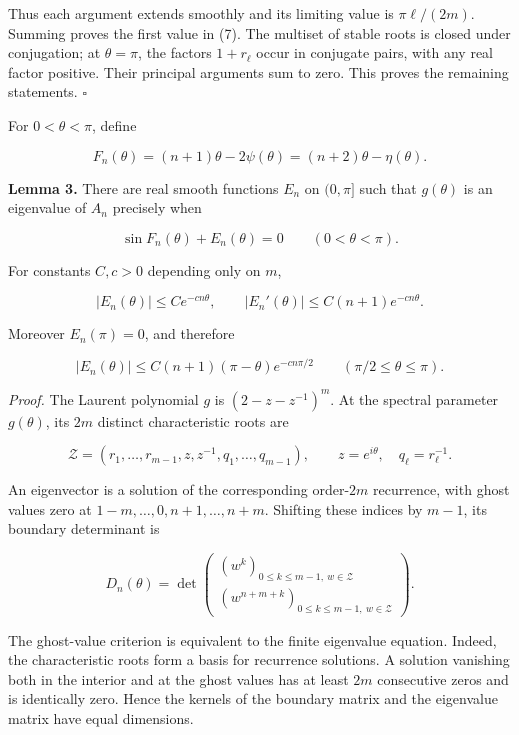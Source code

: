 \documentclass[10pt,a4paper]{article}
\begin{document}
Thus each argument extends smoothly and its limiting value is \(\pi\ell/(2m)\). Summing proves the first value in (7). The multiset of stable roots is closed under conjugation; at \(\theta=\pi\), the factors \(1+r_\ell\) occur in conjugate pairs, with any real factor positive. Their principal arguments sum to zero. This proves the remaining statements. \(\square\)

For \(0<\theta<\pi\), define

\nopagebreak[3]
\[
F_n(\theta)=(n+1)\theta-2\psi(\theta)=(n+2)\theta-\eta(\theta).
\tag{9}
\]

\textbf{Lemma 3.} There are real smooth functions \(E_n\) on \((0,\pi]\) such that \(g(\theta)\) is an eigenvalue of \(A_n\) precisely when

\nopagebreak[3]
\[
\sin F_n(\theta)+E_n(\theta)=0\qquad(0<\theta<\pi).
\tag{10}
\]

For constants \(C,c>0\) depending only on \(m\),

\nopagebreak[3]
\[
|E_n(\theta)|\le C e^{-cn\theta},\qquad
|E_n'(\theta)|\le C(n+1)e^{-cn\theta}.
\tag{11}
\]

Moreover \(E_n(\pi)=0\), and therefore

\nopagebreak[3]
\[
|E_n(\theta)|\le C(n+1)(\pi-\theta)e^{-cn\pi/2}
\qquad(\pi/2\le\theta\le\pi).
\tag{12}
\]

\emph{Proof.} The Laurent polynomial \(g\) is \((2-z-z^{-1})^m\). At the spectral parameter \(g(\theta)\), its \(2m\) distinct characteristic roots are

\nopagebreak[3]
\[
\mathcal Z=(r_1,\ldots,r_{m-1},z,z^{-1},q_1,\ldots,q_{m-1}),\qquad
z=e^{i\theta},\quad q_\ell=r_\ell^{-1}.
\]

An eigenvector is a solution of the corresponding order-\(2m\) recurrence, with ghost values zero at \(1-m,\ldots,0,n+1,\ldots,n+m\). Shifting these indices by \(m-1\), its boundary determinant is

\nopagebreak[3]
\[
D_n(\theta)=\det\begin{pmatrix}
 (w^k)_{0\le k\le m-1,\ w\in\mathcal Z}\\
 (w^{n+m+k})_{0\le k\le m-1,\ w\in\mathcal Z}
\end{pmatrix}.
\tag{13}
\]

The ghost-value criterion is equivalent to the finite eigenvalue equation. Indeed, the characteristic roots form a basis for recurrence solutions. A solution vanishing both in the interior and at the ghost values has at least \(2m\) consecutive zeros and is identically zero. Hence the kernels of the boundary matrix and the eigenvalue matrix have equal dimensions.
\end{document}
